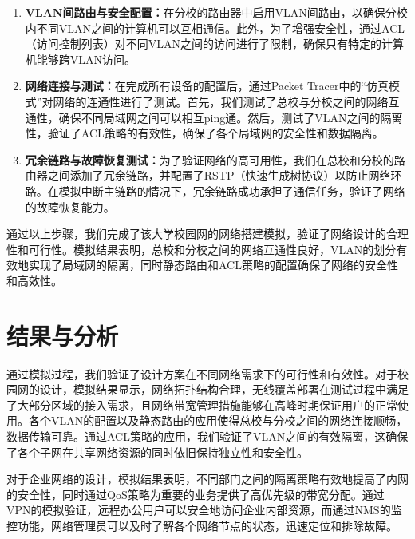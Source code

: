 \documentclass[12pt]{article}
\begin{document}
\begin{enumerate}
    分校路由器：
    \begin{verbatim}
    configure terminal
    ip route 210.100.10.0 255.255.255.224 210.100.10.97
    end
    show ip route
    \end{verbatim}
    静态路由的配置保证了总校和分校之间的数据能够正确传递，从而实现了网络的互通。
    
    \item \textbf{VLAN间路由与安全配置：}在分校的路由器中启用VLAN间路由，以确保分校内不同VLAN之间的计算机可以互相通信。此外，为了增强安全性，通过ACL（访问控制列表）对不同VLAN之间的访问进行了限制，确保只有特定的计算机能够跨VLAN访问。
    
    \item \textbf{网络连接与测试：}在完成所有设备的配置后，通过Packet Tracer中的“仿真模式”对网络的连通性进行了测试。首先，我们测试了总校与分校之间的网络互通性，确保不同局域网之间可以相互ping通。然后，测试了VLAN之间的隔离性，验证了ACL策略的有效性，确保了各个局域网的安全性和数据隔离。

    \item \textbf{冗余链路与故障恢复测试：}为了验证网络的高可用性，我们在总校和分校的路由器之间添加了冗余链路，并配置了RSTP（快速生成树协议）以防止网络环路。在模拟中断主链路的情况下，冗余链路成功承担了通信任务，验证了网络的故障恢复能力。
\end{enumerate}

通过以上步骤，我们完成了该大学校园网的网络搭建模拟，验证了网络设计的合理性和可行性。模拟结果表明，总校和分校之间的网络互通性良好，VLAN的划分有效地实现了局域网的隔离，同时静态路由和ACL策略的配置确保了网络的安全性和高效性。

\section{结果与分析}
通过模拟过程，我们验证了设计方案在不同网络需求下的可行性和有效性。对于校园网的设计，模拟结果显示，网络拓扑结构合理，无线覆盖部署在测试过程中满足了大部分区域的接入需求，且网络带宽管理措施能够在高峰时期保证用户的正常使用。各个VLAN的配置以及静态路由的应用使得总校与分校之间的网络连接顺畅，数据传输可靠。通过ACL策略的应用，我们验证了VLAN之间的有效隔离，这确保了各个子网在共享网络资源的同时依旧保持独立性和安全性。

对于企业网络的设计，模拟结果表明，不同部门之间的隔离策略有效地提高了内网的安全性，同时通过QoS策略为重要的业务提供了高优先级的带宽分配。通过VPN的模拟验证，远程办公用户可以安全地访问企业内部资源，而通过NMS的监控功能，网络管理员可以及时了解各个网络节点的状态，迅速定位和排除故障。
\end{document}
